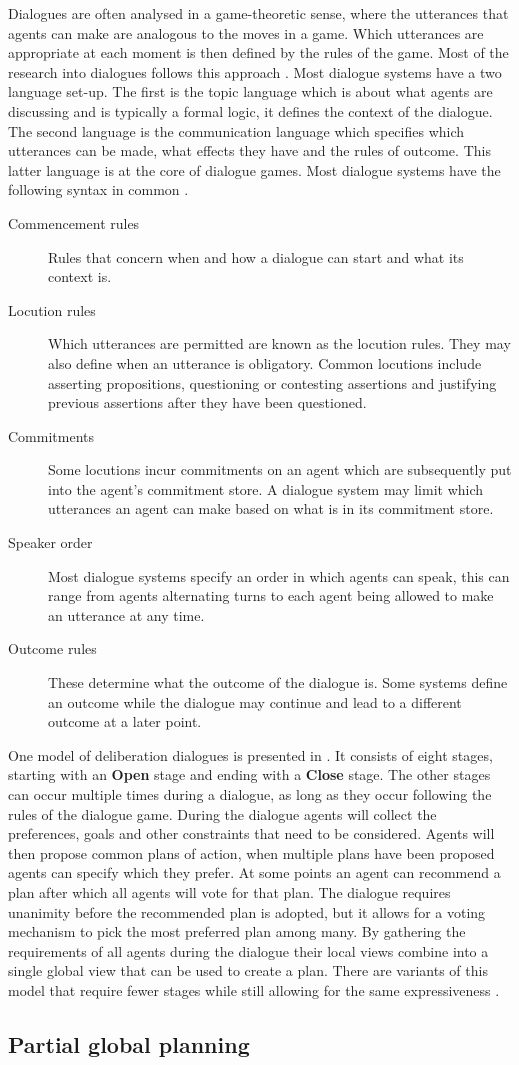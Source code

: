 Dialogues are often analysed in a game-theoretic sense, where the utterances
that agents can make are analogous to the moves in a game. Which utterances are
appropriate at each moment is then defined by the rules of the game. Most of
the research into dialogues follows this approach
\cite{prakken2006,prakken2009}. Most dialogue systems have a two language
set-up. The first is the topic language which is about what agents are
discussing and is typically a formal logic, it defines the context of the
dialogue. The second language is the communication language which specifies
which utterances can be made, what effects they have and the rules of outcome.
This latter language is at the core of dialogue games. Most dialogue systems
have the following syntax in common \cite{prakken2006,prakken2009,mcburney2009}.
\begin{description}
    \item[Commencement rules] Rules that concern when and how a dialogue can
    start and what its context is.
    \item[Locution rules] Which utterances are permitted are known as the
    locution rules. They may also define when an utterance is obligatory.
    Common locutions include asserting propositions, questioning or contesting
    assertions and justifying previous assertions after they have been
    questioned.
    \item[Commitments] Some locutions incur commitments on an agent which are
    subsequently put into the agent's commitment store. A dialogue system may
    limit which utterances an agent can make based on what is in its commitment
    store.
    \item[Speaker order] Most dialogue systems specify an order in which agents
    can speak, this can range from agents alternating turns to each agent being
    allowed to make an utterance at any time.
    \item[Outcome rules] These determine what the outcome of the dialogue is.
    Some systems define an outcome while the dialogue may continue and lead to
    a different outcome at a later point.
\end{description}

One model of deliberation dialogues is presented in \cite{mcburney2007}. It
consists of eight stages, starting with an \textbf{Open} stage and ending with
a \textbf{Close} stage. The other stages can occur multiple times during a
dialogue, as long as they occur following the rules of the dialogue game.
During the dialogue agents will collect the preferences, goals and other
constraints that need to be considered. Agents will then propose common plans
of action, when multiple plans have been proposed agents can specify which they
prefer. At some points an agent can recommend a plan after which all agents
will vote for that plan. The dialogue requires unanimity before the recommended
plan is adopted, but it allows for a voting mechanism to pick the most
preferred plan among many. By gathering the requirements of all agents during
the dialogue their local views combine into a single global view that can be
used to create a plan. There are variants of this model that require fewer
stages while still allowing for the same expressiveness
\cite{dunin-keplicz2011}.

\subsection{Partial global planning}
